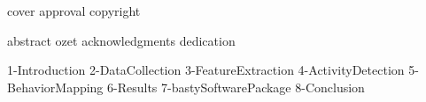 \documentclass[12pt, leqno, oneside, a4paper]{book}
\begin{document}
    {cover}
    {approval}
    {copyright}

    \clearpage {} \setcounter{page}{3}
    {abstract}
    {ozet}
    {acknowledgments}
    {dedication}

    \tableofcontents
    \listoffigures
    \listoftables

    \clearpage {} \setcounter{page}{1} \onehalfspacing
    {1-Introduction}
    {2-DataCollection}
    {3-FeatureExtraction}
    {4-ActivityDetection}
    {5-BehaviorMapping}
    {6-Results}
    {7-bastySoftwarePackage}
    {8-Conclusion}
    \singlespace
    
\end{document}

